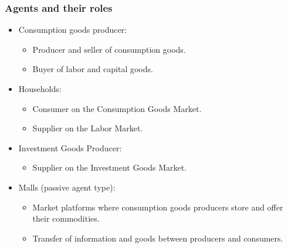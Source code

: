 \documentclass{beamer}
\begin{document}
\frame
{
  \frametitle{Agents and their roles} 
\begin{itemize}
	\item Consumption goods producer:
	
\begin{itemize}
	\item Producer and seller of consumption goods.
	\item Buyer of labor and capital goods. 
\end{itemize}

	\item Households:
	
\begin{itemize}
	\item Consumer on the Consumption Goods Market.
	\item Supplier on the Labor Market.
\end{itemize}

\item Investment Goods Producer:

\begin{itemize}
	\item Supplier on the Investment Goods Market.
\end{itemize}

\item Malls (passive agent type):

\begin{itemize}
	\item Market platforms where consumption goods producers store and offer their commodities.
	\item Transfer of information and goods between producers and consumers.
\end{itemize}
	
\end{itemize}
	

}
\end{document}
